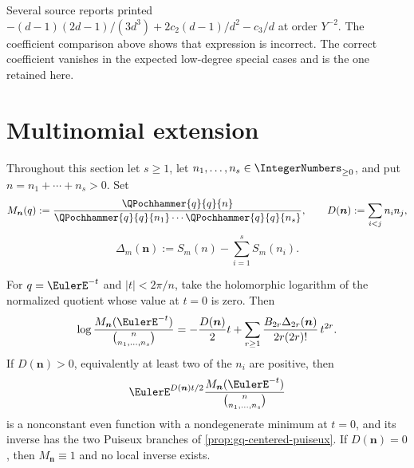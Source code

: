 \begin{remark}
Several source reports printed
\(-{(d-1)(2d-1)}/{(3d^3)}
+{2c_2(d-1)}/{d^2}-{c_3}/{d}\) at order \(Y^{-2}\).
The coefficient comparison above shows that expression is incorrect.  The
correct coefficient vanishes in the expected low-degree special cases and is
the one retained here.
\end{remark}

\section{Multinomial extension}
\label{sec:qmultinomial}

Throughout this section let \(s\ge1\), let
\(n_1,\ldots,n_s\in\IntegerNumbers_{\ge0}\), and put
\(n=n_1+\cdots+n_s>0\).  Set
\[
  M_{\bm n}(q)
  :=\frac{\QPochhammer{q}{q}{n}}
  {\QPochhammer{q}{q}{n_1}\cdots\QPochhammer{q}{q}{n_s}},
  \qquad
  D(\bm n):=\sum_{i<j}n_in_j,
\]
\[
  \Delta_m(\bm n)
  :=S_m(n)-\sum_{i=1}^{s}S_m(n_i).
\]

\begin{theorem}
\label{thm:qm-one-log}
For \(q=\EulerE^{-t}\) and \(|t|<2\pi/n\), take the holomorphic logarithm
of the normalized quotient whose value at \(t=0\) is zero.  Then
\[
  \log\frac{M_{\bm n}(\EulerE^{-t})}
                {\binom{n}{n_1,\ldots,n_s}}
  =-\frac{D(\bm n)}2t+
   \sum_{r\ge1}
   \frac{B_{2r}\Delta_{2r}(\bm n)}
        {2r(2r)!}\,t^{2r}.
\]
If \(D(\bm n)>0\), equivalently at least two of the \(n_i\) are positive,
then
\[
 \EulerE^{D(\bm n)t/2}
 \frac{M_{\bm n}(\EulerE^{-t})}{\binom{n}{n_1,\ldots,n_s}}
\]
is a nonconstant even function with a nondegenerate minimum at \(t=0\), and
its inverse has the two Puiseux branches of
\cref{prop:gq-centered-puiseux}.  If \(D(\bm n)=0\), then
\(M_{\bm n}\equiv1\) and no local inverse exists.
\end{theorem}

